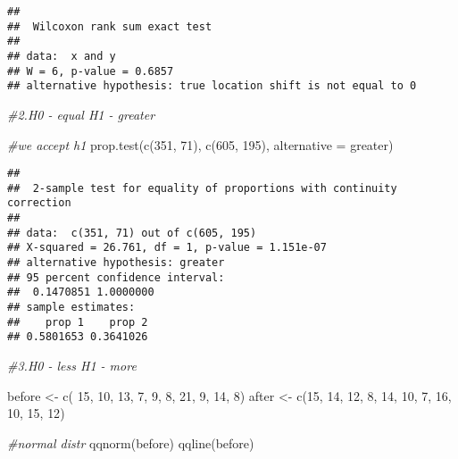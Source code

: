 \documentclass[
]{article}
\newenvironment{Shaded}{\begin{snugshade}}{\end{snugshade}}
\newcommand{\AttributeTok}[1]{\textcolor[rgb]{0.77,0.63,0.00}{#1}}
\newcommand{\CommentTok}[1]{\textcolor[rgb]{0.56,0.35,0.01}{\textit{#1}}}
\newcommand{\DecValTok}[1]{\textcolor[rgb]{0.00,0.00,0.81}{#1}}
\newcommand{\FunctionTok}[1]{\textcolor[rgb]{0.00,0.00,0.00}{#1}}
\newcommand{\NormalTok}[1]{#1}
\newcommand{\OtherTok}[1]{\textcolor[rgb]{0.56,0.35,0.01}{#1}}
\newcommand{\StringTok}[1]{\textcolor[rgb]{0.31,0.60,0.02}{#1}}
\begin{document}
\begin{verbatim}
## 
##  Wilcoxon rank sum exact test
## 
## data:  x and y
## W = 6, p-value = 0.6857
## alternative hypothesis: true location shift is not equal to 0
\end{verbatim}

\begin{Shaded}
\begin{Highlighting}[]
\CommentTok{\#2.H0 {-} equal H1 {-} greater}

\CommentTok{\#we accept h1}
\FunctionTok{prop.test}\NormalTok{(}\FunctionTok{c}\NormalTok{(}\DecValTok{351}\NormalTok{, }\DecValTok{71}\NormalTok{), }\FunctionTok{c}\NormalTok{(}\DecValTok{605}\NormalTok{, }\DecValTok{195}\NormalTok{), }\AttributeTok{alternative =} \StringTok{\textquotesingle{}greater\textquotesingle{}}\NormalTok{)}
\end{Highlighting}
\end{Shaded}

\begin{verbatim}
## 
##  2-sample test for equality of proportions with continuity correction
## 
## data:  c(351, 71) out of c(605, 195)
## X-squared = 26.761, df = 1, p-value = 1.151e-07
## alternative hypothesis: greater
## 95 percent confidence interval:
##  0.1470851 1.0000000
## sample estimates:
##    prop 1    prop 2 
## 0.5801653 0.3641026
\end{verbatim}

\begin{Shaded}
\begin{Highlighting}[]
\CommentTok{\#3.H0 {-} less H1 {-} more}

\NormalTok{before }\OtherTok{\textless{}{-}} \FunctionTok{c}\NormalTok{( }\DecValTok{15}\NormalTok{, }\DecValTok{10}\NormalTok{, }\DecValTok{13}\NormalTok{, }\DecValTok{7}\NormalTok{, }\DecValTok{9}\NormalTok{, }\DecValTok{8}\NormalTok{, }\DecValTok{21}\NormalTok{, }\DecValTok{9}\NormalTok{, }\DecValTok{14}\NormalTok{, }\DecValTok{8}\NormalTok{)}
\NormalTok{after }\OtherTok{\textless{}{-}} \FunctionTok{c}\NormalTok{(}\DecValTok{15}\NormalTok{, }\DecValTok{14}\NormalTok{, }\DecValTok{12}\NormalTok{, }\DecValTok{8}\NormalTok{, }\DecValTok{14}\NormalTok{, }\DecValTok{10}\NormalTok{, }\DecValTok{7}\NormalTok{, }\DecValTok{16}\NormalTok{, }\DecValTok{10}\NormalTok{, }\DecValTok{15}\NormalTok{, }\DecValTok{12}\NormalTok{)}

\CommentTok{\#normal distr}
\FunctionTok{qqnorm}\NormalTok{(before)}
\FunctionTok{qqline}\NormalTok{(before)}
\end{Highlighting}
\end{Shaded}
\end{document}

